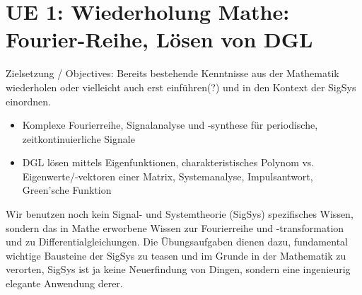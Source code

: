 
\newpage
\section{UE 1: Wiederholung Mathe: Fourier-Reihe, Lösen von DGL}
\label{sec:ue1_intro}
Zielsetzung / Objectives: Bereits bestehende Kenntnisse aus der Mathematik
wiederholen oder vielleicht auch erst einführen(?) und in den Kontext der SigSys einordnen.

\begin{itemize}
\item Komplexe Fourierreihe, Signalanalyse und -synthese für periodische, zeitkontinuierliche Signale
\item DGL lösen mittels Eigenfunktionen, charakteristisches Polynom vs. Eigenwerte/-vektoren einer Matrix, Systemanalyse, Impulsantwort, Green'sche Funktion
\end{itemize}
%
Wir benutzen noch kein Signal- und Systemtheorie (SigSys) spezifisches Wissen,
sondern das in Mathe erworbene Wissen zur Fourierreihe und -transformation
und zu Differentialgleichungen. Die Übungsaufgaben dienen dazu, fundamental
wichtige Bausteine der SigSys zu teasen und im Grunde in der Mathematik zu verorten,
SigSys ist ja keine Neuerfindung von Dingen, sondern eine ingenieurig elegante
Anwendung derer.


\newpage
